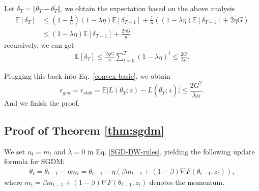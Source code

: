 Let $\delta_{T}=\Vert\theta_T- \theta_T^{\prime}\Vert$, we obtain the expectation based on the above analysis 
  \begin{equation}
  \begin{aligned}
    \mathbb{E}\left[\delta_{T}\right] &\leq (1-\frac{1}{n})(1-\lambda \eta)\mathbb{E}\left[\delta_{T-1}\right] + \frac{1}{n}\left((1-\lambda \eta)\mathbb{E}\left[\delta_{T-1}\right] + 2\eta G\right)\\
    &\leq (1-\lambda \eta)\mathbb{E}\left[\delta_{T-1}\right] + \frac{2\eta G}{n}
  \end{aligned}
 \end{equation}
recursively, we can get 
    \begin{equation}
     \begin{aligned}
      \mathbb{E}\left[\delta_{T}\right] \leq \frac{2\eta G}{n} \sum_{t=0}^{T}(1-\lambda \eta)^t \leq \frac{2G}{\lambda n}.
     \end{aligned}
    \end{equation}

Plugging this back into Eq.~\eqref{convex-basic}, we obtain
 \begin{equation}\label{eq:2.2.1}
  \epsilon_{gen} = \epsilon_{stab} = \mathbb{E}\vert L(\theta_T;z) - L(\theta^{\prime}_T;z)\vert \leq \frac{2G^2}{\lambda n}.
 \end{equation}
And we finish the proof.

\subsection{Proof of Theorem \ref{thm:sgdm}}\label{sec:app-thm:sgdm}

We set $u_t = m_t$ and $\lambda=0$ in Eq. \ref{SGD-DW-rules}, yielding the following update formula for SGDM: 
\begin{equation}
  \begin{aligned}
   \theta_t = \theta_{t-1} - \eta m_t = \theta_{t-1} - \eta (\beta m_{t-1}+(1-\beta)\nabla F(\theta_{t-1},z_t)),
  \end{aligned}
 \end{equation}
where $m_t = \beta m_{t-1}+(1-\beta)\nabla F(\theta_{t-1},z_t)$ denotes the momentum.

